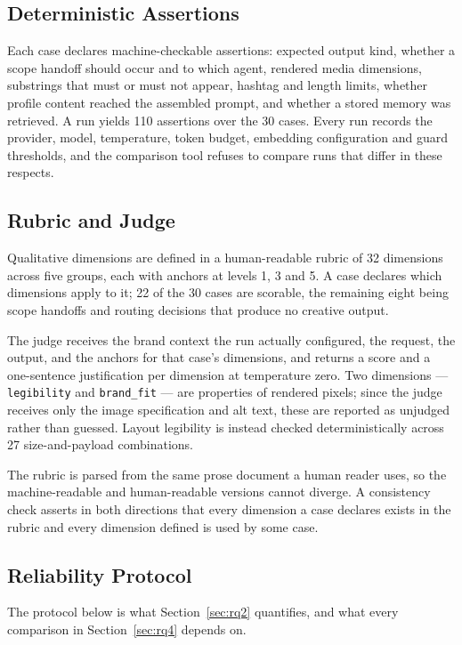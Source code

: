 \documentclass[journal]{IEEEtran}
\begin{document}
\subsection{Deterministic Assertions}
Each case declares machine-checkable assertions: expected output kind, whether
a scope handoff should occur and to which agent, rendered media dimensions,
substrings that must or must not appear, hashtag and length limits, whether
profile content reached the assembled prompt, and whether a stored memory was
retrieved. A run yields 110 assertions over the 30 cases. Every run records the
provider, model, temperature, token budget, embedding configuration and guard
thresholds, and the comparison tool refuses to compare runs that differ in
these respects.

\subsection{Rubric and Judge}
Qualitative dimensions are defined in a human-readable rubric of 32 dimensions
across five groups, each with anchors at levels 1, 3 and 5. A case declares
which dimensions apply to it; 22 of the 30 cases are scorable, the remaining
eight being scope handoffs and routing decisions that produce no creative
output.

The judge receives the brand context the run actually configured, the request,
the output, and the anchors for that case's dimensions, and returns a score and
a one-sentence justification per dimension at temperature zero. Two dimensions
--- \texttt{legibility} and \texttt{brand\_fit} --- are properties of rendered
pixels; since the judge receives only the image specification and alt text,
these are reported as unjudged rather than guessed. Layout legibility is
instead checked deterministically across 27 size-and-payload combinations.

The rubric is parsed from the same prose document a human reader uses, so the
machine-readable and human-readable versions cannot diverge. A consistency
check asserts in both directions that every dimension a case declares exists in
the rubric and every dimension defined is used by some case.

\subsection{Reliability Protocol}
\label{sec:protocol}
The protocol below is what Section~\ref{sec:rq2} quantifies, and what every
comparison in Section~\ref{sec:rq4} depends on.
\end{document}
